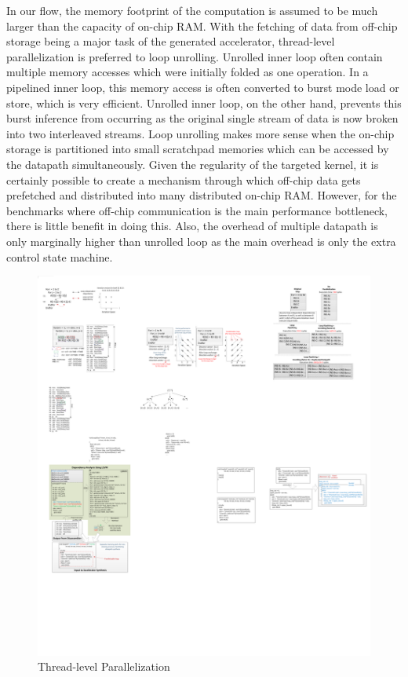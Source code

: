 In our flow, the memory footprint of the computation is assumed to be
much larger than the capacity of on-chip RAM. With the fetching of data
from off-chip storage being a major task of the generated accelerator,
thread-level parallelization is preferred to loop unrolling.
Unrolled inner loop often contain multiple memory accesses which were
initially folded as one operation. In a pipelined inner loop, this
memory access is often converted to burst mode load or store, which is
very efficient. Unrolled inner loop, on the other hand, prevents this burst
inference from occurring as the original single stream of data is now broken
into two interleaved streams.
Loop unrolling makes more sense when the on-chip storage is partitioned into small scratchpad memories which can be accessed by the datapath simultaneously.
Given the regularity of the targeted kernel, it is certainly possible to create a mechanism through which off-chip data gets prefetched and distributed into many distributed on-chip RAM. However, for the benchmarks where off-chip communication 
is the main performance bottleneck, there is little benefit in doing this. 
Also, the overhead of multiple datapath is only marginally higher than unrolled
loop as the main overhead is only the extra control state machine.  

\begin{figure}[htp]
\begin{center}
\includegraphics[width=1.1\linewidth]{chap6fig/threadSplit.pdf}
\caption{Thread-level Parallelization 
\label{fig:threadP}}
\end{center}
\end{figure}

